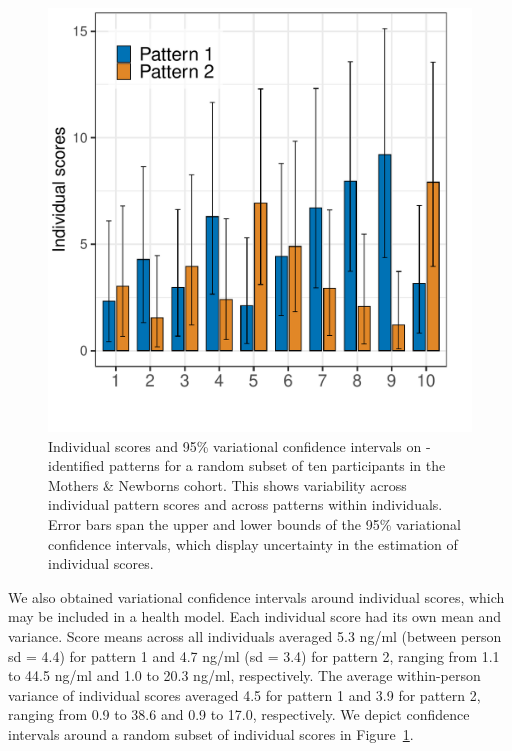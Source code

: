 \begin{figure}[!htbp]
\caption[Individual scores and variational confidence intervals]{Individual scores and 95\% variational confidence intervals on \bnmfc-identified patterns for a random subset of ten participants in the Mothers \& Newborns cohort. This shows variability across individual pattern scores and across patterns within individuals. Error bars span the upper and lower bounds of the 95\% variational confidence intervals, which display uncertainty in the estimation of individual scores.}
\label{fig:scores}
\centering
\includegraphics[scale = 0.5]{./figures/scores_w_vci.pdf}
\end{figure}

We also obtained variational confidence intervals around individual scores, which may be included in a health model. Each individual score had its own mean and variance. Score means across all individuals averaged 5.3 ng/ml (between person sd = 4.4) for pattern 1 and 4.7 ng/ml (sd = 3.4) for pattern 2, ranging from 1.1 to 44.5 ng/ml and 1.0 to 20.3 ng/ml, respectively. The average within-person variance of individual scores averaged 4.5 for pattern 1 and 3.9 for pattern 2, ranging from 0.9 to 38.6 and 0.9 to 17.0, respectively. We depict confidence intervals around a random subset of individual scores in Figure~\ref{fig:scores}.


